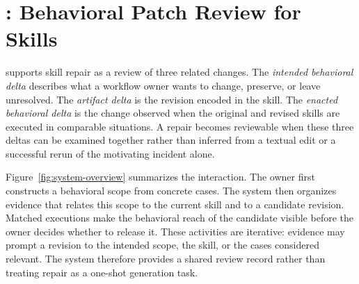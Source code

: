 \section{\systemname: Behavioral Patch Review for Skills}
\label{sec:system}

\systemname{} supports skill repair as a review of three related changes. The
\emph{intended behavioral delta} describes what a workflow owner wants to
change, preserve, or leave unresolved. The \emph{artifact delta} is the
revision encoded in the skill. The \emph{enacted behavioral delta} is the
change observed when the original and revised skills are executed in
comparable situations. A repair becomes reviewable when these three deltas can
be examined together rather than inferred from a textual edit or a successful
rerun of the motivating incident alone.

Figure~\ref{fig:system-overview} summarizes the interaction. The owner first
constructs a behavioral scope from concrete cases. The system then organizes
evidence that relates this scope to the current skill and to a candidate
revision. Matched executions make the behavioral reach of the candidate
visible before the owner decides whether to release it. These activities are
iterative: evidence may prompt a revision to the intended scope, the skill, or
the cases considered relevant. The system therefore provides a shared review
record rather than treating repair as a one-shot generation task.


